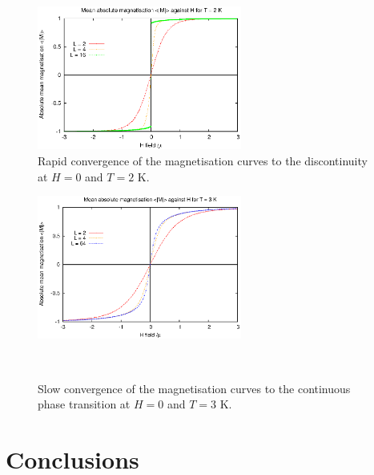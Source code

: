 \documentclass[a4paper]{article}
\begin{document}
\begin{figure} [H]
\centering
\includegraphics[width=0.6\textwidth]{h_sub.eps}
\caption{\label{fig:generic} Rapid convergence of the magnetisation curves to the discontinuity at $H = 0$ and $T = 2$ K. }
\end{figure}

\begin{figure} [H]
\centering
\includegraphics[width=0.6\textwidth]{h_super.eps}
\caption{\label{fig:generic} Slow convergence of the magnetisation curves to the continuous phase transition at $H = 0$ and $T = 3$ K. }\(\)
\end{figure}

\pagebreak

\section {Conclusions}
\end{document}
